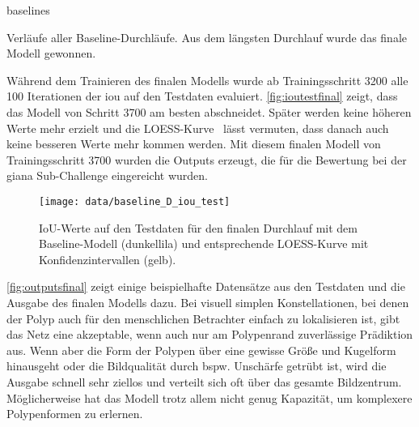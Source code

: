 \begin{losses}{baselines}
	\caption[Verläufe aller Baseline-Durchläufe]{Verläufe aller Baseline-Durchläufe. Aus dem längsten Durchlauf wurde das finale Modell gewonnen.}
	\label{fig:lossbaselineAtoD}
\end{losses}

Während dem Trainieren des finalen Modells wurde ab Trainingsschritt 3200 alle 100 Iterationen der \gls{iou} auf den Testdaten evaluiert.
\autoref{fig:ioutestfinal} zeigt, dass das Modell von Schritt 3700 am besten abschneidet.
Später werden keine höheren Werte mehr erzielt und die LOESS-Kurve~\cite{Cleveland.1992} lässt vermuten, dass danach auch keine besseren Werte mehr kommen werden.
Mit diesem finalen Modell von Trainingsschritt 3700 wurden die Outputs erzeugt, die für die Bewertung bei der \gls{giana} Sub-Challenge eingereicht wurden.

\begin{figure}
	\centering
	\texttt{[image: data/baseline\_D\_iou\_test]}
	\caption[IoU-Werte auf den Testdaten für den finalen Durchlauf mit dem Baseline-Modell und entsprechende LOESS-Kurve]{IoU-Werte auf den Testdaten für den finalen Durchlauf mit dem Baseline-Modell (dunkellila) und entsprechende LOESS-Kurve mit Konfidenzintervallen (gelb).}
	\label{fig:ioutestfinal}
\end{figure}

\autoref{fig:outputsfinal} zeigt einige beispielhafte Datensätze aus den Testdaten und die Ausgabe des finalen Modells dazu.
Bei visuell simplen Konstellationen, bei denen der Polyp auch für den menschlichen Betrachter einfach zu lokalisieren ist, gibt das Netz eine akzeptable, wenn auch nur am Polypenrand zuverlässige Prädiktion aus.
Wenn aber die Form der Polypen über eine gewisse Größe und Kugelform hinausgeht oder die Bildqualität durch bspw. Unschärfe getrübt ist, wird die Ausgabe schnell sehr ziellos und verteilt sich oft über das gesamte Bildzentrum.
Möglicherweise hat das Modell trotz allem nicht genug Kapazität, um komplexere Polypenformen zu erlernen.


